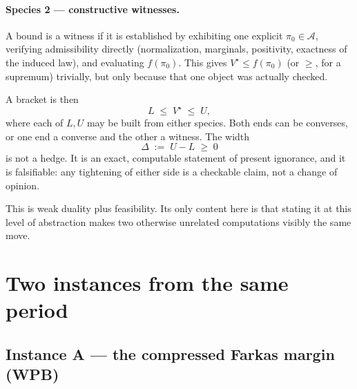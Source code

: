 \documentclass[11pt,a4paper]{article}
\newcommand{\Acal}{\mathcal{A}}
\begin{document}
\paragraph{Species 2 --- constructive witnesses.}
A bound is a witness if it is established by exhibiting one explicit \(\pi_0\in\Acal\), verifying admissibility directly (normalization, marginals, positivity, exactness of the induced law), and evaluating \(f(\pi_0)\). This gives \(V^\star\le f(\pi_0)\) (or \(\ge\), for a supremum) trivially, but only because that one object was actually checked.

A bracket is then
\begin{equation}
  L \;\le\; V^\star \;\le\; U,
\end{equation}
where each of \(L,U\) may be built from either species. Both ends can be converses, or one end a converse and the other a witness. The width
\begin{equation}
  \Delta \;:=\; U-L \;\ge\; 0
\end{equation}
is not a hedge. It is an exact, computable statement of present ignorance, and it is falsifiable: any tightening of either side is a checkable claim, not a change of opinion.

This is weak duality plus feasibility. Its only content here is that stating it at this level of abstraction makes two otherwise unrelated computations visibly the same move.

\section{Two instances from the same period}

\subsection{Instance A --- the compressed Farkas margin (WPB)}
\end{document}
